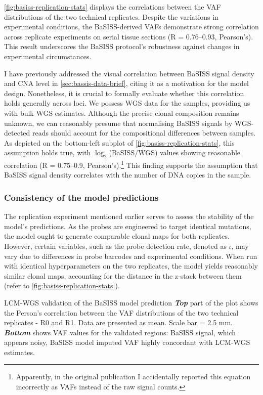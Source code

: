 \cref{fig:basiss-replication-stats} displays the correlations between the \ac{VAF} distributions of the two technical replicates. Despite the variations in experimental conditions, the \ac{BaSISS}-derived \ac{VAF}s demonstrate strong correlation across replicate experiments on serial tissue sections (R = 0.76–0.93, Pearson's). This result underscores the \ac{BaSISS} protocol's robustness against changes in experimental circumstances.

I have previously addressed the visual correlation between \ac{BaSISS} signal density and \ac{CNA} level in \cref{sec:bassis-data-brief}, citing it as a motivation for the model design. Nonetheless, it is crucial to formally evaluate whether this correlation holds generally across loci. We possess \ac{WGS} data for the samples, providing us with bulk \ac{WGS} estimates. Although the precise clonal composition remains unknown, we can reasonably presume that normalising \ac{BaSISS} signals by \ac{WGS}-detected reads should account for the compositional differences between samples. As depicted on the bottom-left subplot of \cref{fig:basiss-replication-stats}, this assumption holds true, with $\log_2$(\ac{BaSISS}/\ac{WGS}) values showing reasonable correlation (R = 0.75–0.9, Pearson’s).\footnote{Apparently, in the original publication I accidentally reported this equation incorrectly as \ac{VAF}s instead of the raw signal counts.} This finding supports the assumption that \ac{BaSISS} signal density correlates with the number of DNA copies in the sample.

\subsubsection*{Consistency of the model predictions}
The replication experiment mentioned earlier serves to assess the stability of the model's predictions. As the probes are engineered to target identical mutations, the model ought to generate comparable clonal maps for both replicates. However, certain variables, such as the probe detection rate, denoted as $\iota$, may vary due to differences in probe barcodes and experimental conditions. When run with identical hyperparameters on the two replicates, the model yields reasonably similar clonal maps, accounting for the distance in the z-stack between them (refer to \cref{fig:basiss-replication-stats}).

    {\acs{LCM}-\acs{WGS} validation of the \acs{BaSISS} model prediction}
    {\textbf{\textit{Top}} part of the plot shows the Person's correlation between the \ac{VAF} distributions of the two technical replicates - R0 and R1. Data are presented as mean. Scale bar = 2.5 mm. \textbf{\textit{Bottom}} shows \ac{VAF} values for the validated regions: \ac{BaSISS} signal, which appears noisy, \ac{BaSISS} model imputed \ac{VAF} highly concordant with \ac{LCM}-\ac{WGS} estimates.}

